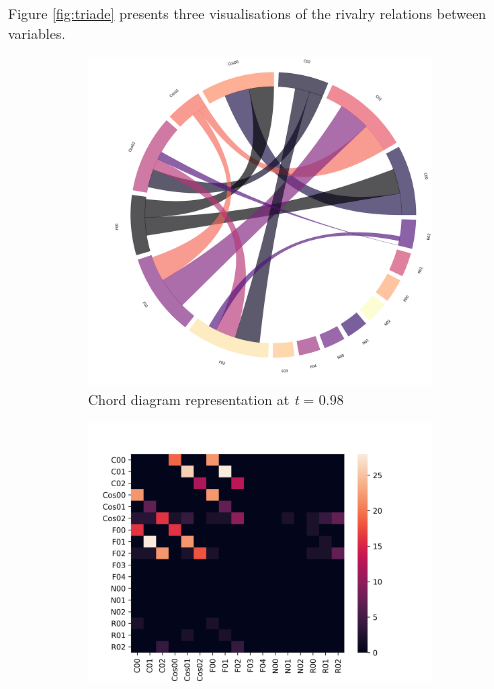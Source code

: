 Figure \ref{fig:triade} presents three visualisations of the rivalry relations between variables.
\begin{figure}[!h]
	\centering
	\begin{subfigure}[b]{0.3\linewidth}
		\includegraphics[width=\linewidth]{figures/chords/chord_swap_Ensemble1000_RCN5333300_097.png}
		\caption{Chord diagram representation at \emph{t} = 0.98}
	\end{subfigure}
	\hfill
	\begin{subfigure}[b]{0.3\linewidth}
		\includegraphics[width=\linewidth]{figures/heatmaps/heatmap_swap_Ensemble1000_RCN5333300_097.png}

\end{subfigure}
\end{figure}
